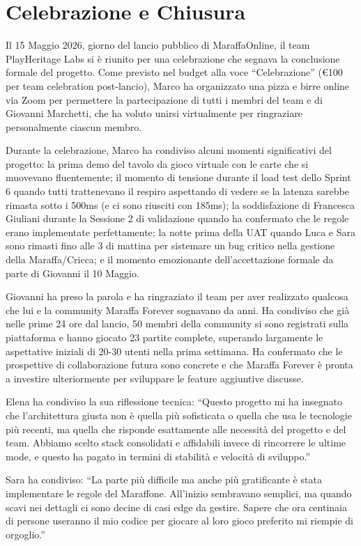\section{Celebrazione e Chiusura}

Il 15 Maggio 2026, giorno del lancio pubblico di MaraffaOnline, il team PlayHeritage Labs si è riunito per una celebrazione che segnava la conclusione formale del progetto. Come previsto nel budget alla voce ``Celebrazione'' (€100 per team celebration post-lancio), Marco ha organizzato una pizza e birre online via Zoom per permettere la partecipazione di tutti i membri del team e di Giovanni Marchetti, che ha voluto unirsi virtualmente per ringraziare personalmente ciascun membro.

Durante la celebrazione, Marco ha condiviso alcuni momenti significativi del progetto: la prima demo del tavolo da gioco virtuale con le carte che si muovevano fluentemente; il momento di tensione durante il load test dello Sprint 6 quando tutti trattenevano il respiro aspettando di vedere se la latenza sarebbe rimasta sotto i 500ms (e ci sono riusciti con 185ms); la soddisfazione di Francesca Giuliani durante la Sessione 2 di validazione quando ha confermato che le regole erano implementate perfettamente; la notte prima della UAT quando Luca e Sara sono rimasti fino alle 3 di mattina per sistemare un bug critico nella gestione della Maraffa/Cricca; e il momento emozionante dell'accettazione formale da parte di Giovanni il 10 Maggio.

Giovanni ha preso la parola e ha ringraziato il team per aver realizzato qualcosa che lui e la community Maraffa Forever sognavano da anni. Ha condiviso che già nelle prime 24 ore dal lancio, 50 membri della community si sono registrati sulla piattaforma e hanno giocato 23 partite complete, superando largamente le aspettative iniziali di 20-30 utenti nella prima settimana. Ha confermato che le prospettive di collaborazione futura sono concrete e che Maraffa Forever è pronta a investire ulteriormente per sviluppare le feature aggiuntive discusse.

Elena ha condiviso la sua riflessione tecnica: ``Questo progetto mi ha insegnato che l'architettura giusta non è quella più sofisticata o quella che usa le tecnologie più recenti, ma quella che risponde esattamente alle necessità del progetto e del team. Abbiamo scelto stack consolidati e affidabili invece di rincorrere le ultime mode, e questo ha pagato in termini di stabilità e velocità di sviluppo.''

Sara ha condiviso: ``La parte più difficile ma anche più gratificante è stata implementare le regole del Maraffone. All'inizio sembravano semplici, ma quando scavi nei dettagli ci sono decine di casi edge da gestire. Sapere che ora centinaia di persone useranno il mio codice per giocare al loro gioco preferito mi riempie di orgoglio.''

